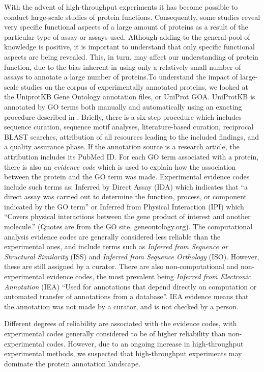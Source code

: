 \documentclass[10pt]{bmc_article}
\newenvironment{bmcformat}{\begin{raggedright}\baselineskip20pt\sloppy\setboolean{publ}{false}}{\end{raggedright}\baselineskip20pt\sloppy}
\begin{document}
\begin{bmcformat}
With the advent of high-throughput experiments it has become possible to conduct large-scale
studies of protein functions. Consequently, some studies reveal very specific functional
aspects of a large amount of proteins as a result of the particular type of assay or assays
used. Although adding to the general pool of knowledge is positive, it is important to
understand that only specific functional aspects are being revealed. This, in turn, may affect
our understanding of protein function, due to the bias inherent in using only a relatively
small number of assays to annotate a large number of proteins.To understand the impact of
large-scale studies on the corpus of experimentally annotated proteins, we looked at the
UniprotKB Gene Ontology annotation files, or UniProt GOA. UniProtKB is annotated by GO terms
both manually and automatically using an exacting procedure described in \cite{UniprotKB-GOA}.
Briefly, there is a six-step procedure which includes sequence curation, sequence motif
analyses, literature-based curation, reciprocal BLAST\cite{BLAST} searches, attribution of all
resources leading to the included findings, and a quality assurance phase. If the annotation
source is a research article, the attribution includes its PubMed ID.  For each GO term
associated with a protein, there is also an \textit{evidence code} which is used to explain how
the association between the protein and the GO term was made. Experimental evidence codes
include such terms as: Inferred by Direct Assay (IDA) which indicates that ``a direct assay was
carried out to determine the function, process, or component indicated by the GO term'' or
Inferred from Physical Interaction (IPI) which ``Covers physical interactions between the gene
product of interest and another molecule.'' (Quotes are from the GO site, geneontology.org).
The computational analysis evidence codes are generally considered less reliable than the
experimental ones, and include terms such as \textit{Inferred from Sequence or Structural
Similarity} (ISS) and \textit{Inferred from Sequence Orthology} (ISO). However, these are still
assigned by a curator. There are also non-computational and non-experimental evidence codes,
the most prevalent being \textit{Inferred from Electronic Annotation} (IEA) ``Used for
annotations that depend directly on computation or automated transfer of annotations from a
database''. IEA evidence means that the annotation was not made by a curator, and is not
checked by a person.

Different degrees of reliability are associated with the  evidence codes, with
experimental codes generally considered to be of higher reliability than non-experimental
codes. However, due to an ongoing increase in high-throughput experimental
methods, we suspected that high-throughput experiments may dominate the protein
annotation landscape. 


\end{bmcformat}
\end{document}
